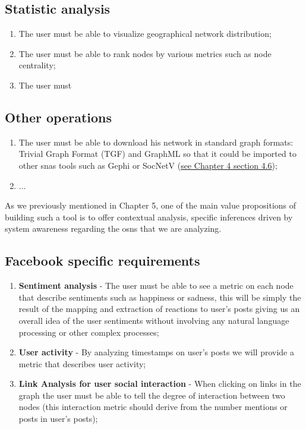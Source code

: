\subsection{Statistic analysis}

\begin{enumerate}
    \item The user must be able to visualize geographical network distribution;
    \item The user must be able to rank nodes by various metrics such as node centrality;
    \item The user must
\end{enumerate}

\subsection{Other operations}

\begin{enumerate}
    \item The user must be able to download his network in standard graph formats: Trivial Graph Format (TGF) and GraphML so that it could
    be imported to other \glspl{sna} tools such as Gephi or SocNetV (\hyperref[sec:snas]{see Chapter 4 section 4.6});
    \item ...

\end{enumerate}



As we previously mentioned in Chapter 5, one of the main value propositions of building such a tool is to offer contextual analysis, specific inferences driven
by system awareness regarding the \glspl{osn} that we are analyzing.

\subsection{Facebook specific requirements}

\begin{enumerate}
    \item \textbf{Sentiment analysis} - The user must be able to see a metric on each node that describe sentiments such as happiness or sadness, this will be simply the result of the mapping and extraction of reactions to user's posts giving us an overall idea of the user sentiments without involving any natural language processing or other complex processes;
    \item \textbf{User activity} - By analyzing timestamps on user's posts we will provide a metric that describes user activity;
    \item \textbf{Link Analysis for user social interaction} - When clicking on links in the graph the user must be able to tell the degree of interaction between two nodes (this interaction metric should derive from the number mentions or posts in user's posts);
\end{enumerate}

